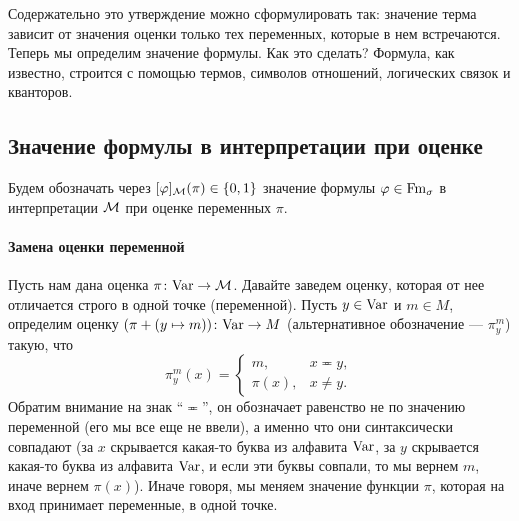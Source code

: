 Содержательно это утверждение можно сформулировать так: значение терма зависит от значения оценки только тех переменных, которые в нем встречаются.
Теперь мы определим значение формулы.
Как это сделать?
Формула, как известно, строится с помощью термов, символов отношений, логических связок и кванторов.

\subsection{Значение формулы в интерпретации при оценке}

\begin{notation*}
    Будем обозначать через $[\varphi]_{\mathcal{M}}(\pi) \in \{0, 1\}$ значение формулы $\varphi \in \mathrm{Fm}_{\sigma}$ в интерпретации $\mathcal{M}$ при оценке переменных $\pi$.
\end{notation*}

\paragraph{Замена оценки переменной}
Пусть нам дана оценка $\pi \colon \mathrm{Var} \to \mathcal{M}$.
Давайте заведем оценку, которая от нее отличается строго в одной точке (переменной).
Пусть $y \in \mathrm{Var}$ и $m \in M$, определим оценку $(\pi + (y \mapsto m)) \colon \mathrm{Var} \to M$ (альтернативное обозначение --- $\pi_{y}^{m}$) такую, что
$$
    \pi_{y}^{m}(x) = \begin{cases}
        m, & x \eqcirc y, \\
        \pi(x), & x \neq y.
    \end{cases}
$$
Обратим внимание на знак \enquote{$\eqcirc$}, он обозначает равенство не по значению переменной (его мы все еще не ввели), а именно что они синтаксически совпадают (за $x$ скрывается какая-то буква из алфавита $\mathrm{Var}$, за $y$ скрывается какая-то буква из алфавита $\mathrm{Var}$, и если эти буквы совпали, то мы вернем $m$, иначе вернем $\pi(x)$).
Иначе говоря, мы меняем значение функции $\pi$, которая на вход принимает переменные, в одной точке.

